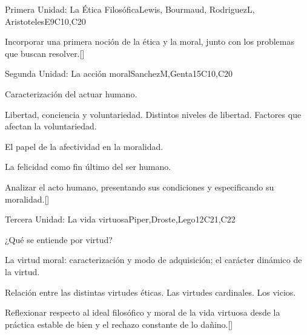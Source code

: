 \begin{syllabus}
\begin{unit}{}{Primera Unidad: La Ética Filosófica}{Lewis, Bourmaud, RodriguezL, AristotelesE}{9}{C10,C20}
\begin{topics}
\end{topics}
\begin{learningoutcomes}
	\item Incorporar una primera noción de la ética y la moral, junto con los problemas que buscan resolver.[\Familiarity]
\end{learningoutcomes}
\end{unit}

\begin{unit}{}{Segunda Unidad: La acción moral}{SanchezM,Genta}{15}{C10,C20}
\begin{topics}
    \item Caracterización del actuar humano.
    \item Libertad, conciencia y voluntariedad. Distintos niveles de libertad. Factores que afectan la voluntariedad.
    \item El papel de la afectividad en la moralidad.
    \item La felicidad como fin último del ser humano.

\end{topics}
\begin{learningoutcomes}
	\item Analizar el acto humano, presentando sus condiciones y especificando su moralidad.[\Familiarity]
\end{learningoutcomes}
\end{unit}

\begin{unit}{}{Tercera Unidad: La vida virtuosa}{Piper,Droste,Lego}{12}{C21,C22}
\begin{topics}
    \item ¿Qué se entiende por virtud?
    \item La virtud moral: caracterización y modo de adquisición; el carácter dinámico de la virtud.
    \item Relación entre las distintas virtudes éticas. Las virtudes cardinales. Los vicios.
\end{topics}
\begin{learningoutcomes}
	\item Reflexionar respecto al ideal filosófico y moral de la vida virtuosa desde la práctica estable de bien y el rechazo constante de lo dañino.[\Familiarity]
\end{learningoutcomes}
\end{unit}


\end{syllabus}
